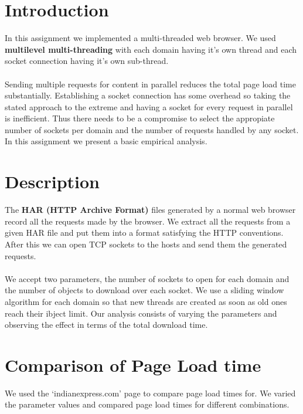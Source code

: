 \documentclass[12pt]{article}
\author{
  Singhal, Madhur\\
  \texttt{2015CS10235}
  \and
  Chhajwani, Anant\\
  \texttt{2015CS50281}
}
\begin{document}
\maketitle


\section{Introduction}

In this assignment we implemented a multi-threaded web browser. We used \textbf{multilevel multi-threading} with each domain having it's own thread and each socket connection having it's own sub-thread.
\paragraph{}
Sending multiple requests for content in parallel reduces the total page load time substantially. Establishing a socket connection has some overhead so taking the stated approach to the extreme and having a socket for every request in parallel is inefficient. Thus there needs to be a compromise to select the appropiate number of sockets per domain and the number of requests handled by any socket. In this assignment we present a basic empirical analysis.
\section{Description}
The \textbf{HAR (HTTP Archive Format)} files generated by a normal web browser record all the requests made by the browser. We extract all the requests from a given HAR file and put them into a format satisfying the HTTP conventions. After this we can open TCP sockets to the hosts and send them the generated requests. 
\paragraph{}
We accept two parameters, the number of sockets to open for each domain and the number of objects to download over each socket. We use a sliding window algorithm for each domain so that new threads are created as soon as old ones reach their ibject limit. Our analysis consists of varying the parameters and observing the effect in terms of the total download time.
\section{Comparison of Page Load time}

We used the `indianexpress.com' page to compare page load times for. We varied the parameter values and compared page load times for different combinations.
\end{document}
